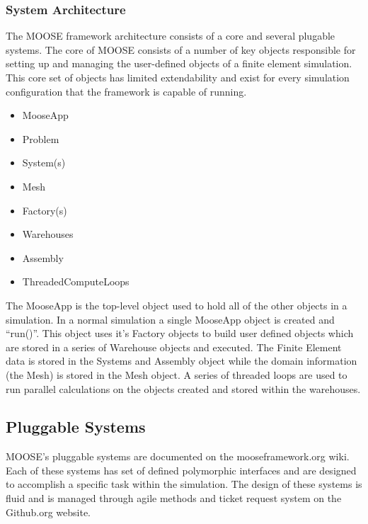 \documentclass{INLreport}
\begin{document}
\subsubsection{System Architecture}
The MOOSE framework architecture consists of a core and several plugable systems. The core of MOOSE consists of a number of key objects responsible for setting up and managing the user-defined objects of a finite element simulation. This core set of objects has limited extendability and exist for every simulation configuration that the framework is capable of running.

\begin{itemize}
\item MooseApp
\item Problem
\item System(s)
\item Mesh
\item Factory(s)
\item Warehouses
\item Assembly
\item ThreadedComputeLoops
\end{itemize}

The MooseApp is the top-level object used to hold all of the other objects in a simulation. In a normal simulation a single MooseApp object is created and ``run()''. This object uses it's Factory objects to build user defined objects which are stored in a series of Warehouse objects and executed. The Finite Element data is stored in the Systems and Assembly object while the domain information (the Mesh) is stored in the Mesh object. A series of threaded loops are used to run parallel calculations on the objects created and stored within the warehouses.

\subsection{Pluggable Systems}
MOOSE's pluggable systems are documented on the mooseframework.org wiki. Each of these systems has set of defined polymorphic interfaces and are designed to accomplish a specific task within the simulation. The design of these systems is fluid and is managed through agile methods and ticket request system on the Github.org website.
\end{document}
